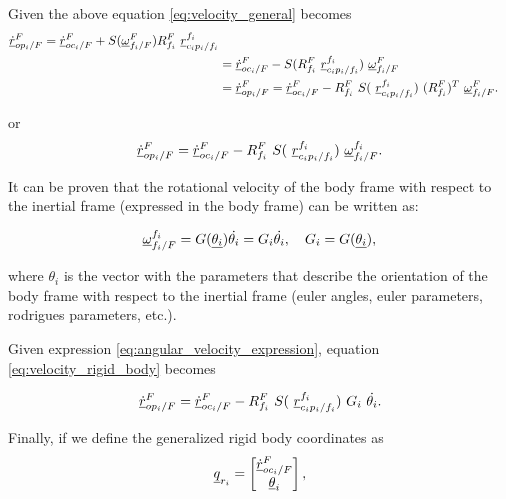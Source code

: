 Given the above equation \eqref{eq:velocity_general} becomes
\begin{align*}
    \pvec{\dot{r}}{op_{i}}{F}{F} = \pvec{\dot{r}}{oc_{i}}{F}{F} + 
    S(\pvec{\omega}{f_{i}}{F}{F}) \rot{R}{f_{i}}{F} \ \pvec{r}{c_{i}p_{i}}{f_i}{f_i} \\
    & = \pvec{\dot{r}}{oc_{i}}{F}{F} - S(\rot{R}{f_{i}}{F} \ \pvec{r}{c_{i}p_{i}}{f_i}{f_i}) \ \pvec{\omega}{f_{i}}{F}{F} \\ 
    & = \pvec{\dot{r}}{op_{i}}{F}{F} = \pvec{\dot{r}}{oc_{i}}{F}{F} -
    \rot{R}{f_{i}}{F} \ S( \ \pvec{r}{c_{i}p_{i}}{f_i}{f_i}) \ (\rot{R}{f_{i}}{F})^{T} \ \pvec{\omega}{f_{i}}{F}{F}.  
\end{align*}

or
\begin{equation}
    \pvec{\dot{r}}{op_{i}}{F}{F} = \pvec{\dot{r}}{oc_{i}}{F}{F} - 
    \rot{R}{f_{i}}{F} \ S( \ \pvec{r}{c_{i}p_{i}}{f_i}{f_i})\ \pvec{\omega}{f_{i}}{F}{f_i}.
    \label{eq:velocity_rigid_body}
\end{equation}

It can be proven that the rotational velocity of the body frame with respect to
the inertial frame (expressed in the body frame) can be written as:

\begin{equation}
    \pvec{\omega}{f_{i}}{F}{f_i} = G(\vecd{\theta_{i}})\dot{\theta_{i}} = 
    G_{i}\dot{\theta_{i}}, \quad G_{i} = G(\vecd{\theta_{i}}),  
    \label{eq:angular_velocity_expression}
\end{equation}

where $\theta_{i}$ is the vector with the parameters that describe the orientation 
of the body frame with respect to the inertial frame (euler angles, euler parameters,
rodrigues parameters, etc.).

Given expression \eqref{eq:angular_velocity_expression}, equation \eqref{eq:velocity_rigid_body}
becomes    

\[
    \pvec{\dot{r}}{op_{i}}{F}{F} = \pvec{\dot{r}}{oc_{i}}{F}{F} - 
    \rot{R}{f_{i}}{F} \ S( \ \pvec{r}{c_{i}p_{i}}{f_i}{f_i})\ 
    G_{i}\ \dot{\theta_{i}}.
\]

Finally, if we define the generalized rigid body coordinates as 
\begin{equation}
    \vecd{q}_{r_{i}} = \begin{bmatrix}
        \pvec{\dot{r}}{oc_{i}}{F}{F} \\  \vecd{\theta}_{i}
    \end{bmatrix},
    \label{eq:rigid_body_coordinates}
\end{equation}

